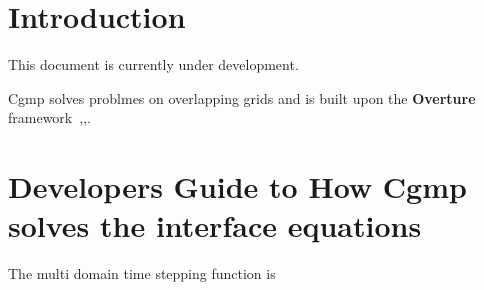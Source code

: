 \documentclass[11pt]{article}
\newcommand{\Overture}{{\bf Over\-ture\ }}
\begin{document}
\clearpage
\tableofcontents
\listoffigures

\vfill\eject


\section{Introduction}

This document is currently under development. 


Cgmp solves problmes on overlapping grids and is built upon the \Overture 
framework~\cite{Brown97},\cite{Henshaw96a},\cite{iscope97}. 



\clearpage
\section{Developers Guide to How Cgmp solves the interface equations}


The multi domain time stepping function is 






\vfill\eject




\printindex
\end{document}
